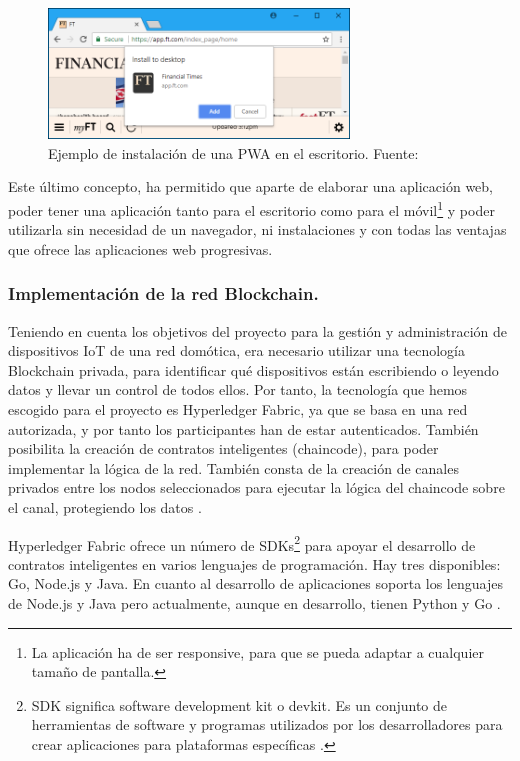 \vspace{5mm}

\begin{figure}[ht!]
    \centering
    \includegraphics[width=8cm]{imagenes/herramientas/pwa-instalacion}
    \caption{Ejemplo de instalación de una PWA en el escritorio. Fuente: \cite{progressive-web-apps}}
    \label{fig:instalacion-pwa}
\end{figure}

\vspace{5mm}

\noindent Este último concepto, ha permitido que aparte de elaborar una aplicación web, poder tener una aplicación 
tanto para el escritorio como para el móvil\footnote{La aplicación ha de ser responsive, para que se pueda adaptar a 
cualquier tamaño de pantalla.\label{fnlabel}} y poder utilizarla sin necesidad de un navegador, ni instalaciones y con 
todas las ventajas que ofrece las aplicaciones web progresivas. 

\subsubsection{Implementación de la red Blockchain.}

Teniendo en cuenta los objetivos del proyecto para la gestión y administración de dispositivos IoT de una red
domótica, era necesario utilizar una tecnología Blockchain privada, para identificar qué dispositivos están
escribiendo o leyendo datos y llevar un control de todos ellos. Por tanto, la tecnología que hemos escogido 
para el proyecto es Hyperledger Fabric, ya que se basa en una red autorizada, y por tanto los participantes
han de estar autenticados. También posibilita la creación de contratos inteligentes (chaincode), para poder 
implementar la lógica de la red. También consta de la creación de canales privados entre los nodos seleccionados 
para ejecutar la lógica del chaincode sobre el canal, protegiendo los datos \cite{why-hyperledger-fabric}.

\vspace{5mm}

\noindent Hyperledger Fabric ofrece un número de SDKs\footnote{SDK significa software development kit o devkit. Es un
conjunto de herramientas de software y programas utilizados por los desarrolladores para crear aplicaciones para 
plataformas específicas \cite{what-is-sdk}.\label{fnlabel}} para apoyar el desarrollo de contratos 
inteligentes en varios lenguajes de programación. Hay tres disponibles: Go, Node.js y Java. En cuanto al desarrollo 
de aplicaciones soporta los lenguajes de Node.js y Java pero actualmente, aunque en desarrollo, tienen Python y Go 
\cite{hyperledger-fabric-docs, hyperledger-fabric-nodejs-sdk}.

